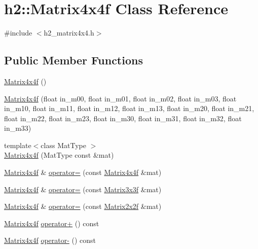 \hypertarget{classh2_1_1_matrix4x4f}{\section{h2\-:\-:Matrix4x4f Class Reference}
\label{classh2_1_1_matrix4x4f}
}


{\ttfamily \#include $<$h2\-\_\-matrix4x4.\-h$>$}

\subsection*{Public Member Functions}
\begin{DoxyCompactItemize}
\item 
\hyperlink{classh2_1_1_matrix4x4f_a2d77ee0ff229519884cdc69c3c4d9d4d}{Matrix4x4f} ()
\item 
\hyperlink{classh2_1_1_matrix4x4f_a44018cad0ac7e6093221ad7bbbe6bd94}{Matrix4x4f} (float in\-\_\-m00, float in\-\_\-m01, float in\-\_\-m02, float in\-\_\-m03, float in\-\_\-m10, float in\-\_\-m11, float in\-\_\-m12, float in\-\_\-m13, float in\-\_\-m20, float in\-\_\-m21, float in\-\_\-m22, float in\-\_\-m23, float in\-\_\-m30, float in\-\_\-m31, float in\-\_\-m32, float in\-\_\-m33)
\item 
{\footnotesize template$<$class Mat\-Type $>$ }\\\hyperlink{classh2_1_1_matrix4x4f_aca35c97f3111e78452e0de91644039cc}{Matrix4x4f} (Mat\-Type const \&mat)
\item 
\hyperlink{classh2_1_1_matrix4x4f}{Matrix4x4f} \& \hyperlink{classh2_1_1_matrix4x4f_a3711ef8b60c9d83e1c13c2e6c20040e6}{operator=} (const \hyperlink{classh2_1_1_matrix4x4f}{Matrix4x4f} \&mat)
\item 
\hyperlink{classh2_1_1_matrix4x4f}{Matrix4x4f} \& \hyperlink{classh2_1_1_matrix4x4f_ad27b689a7b094756d0651b0bff4155df}{operator=} (const \hyperlink{classh2_1_1_matrix3x3f}{Matrix3x3f} \&mat)
\item 
\hyperlink{classh2_1_1_matrix4x4f}{Matrix4x4f} \& \hyperlink{classh2_1_1_matrix4x4f_aee40852c5971f789dc5c3381d74e8a35}{operator=} (const \hyperlink{classh2_1_1_matrix2x2f}{Matrix2x2f} \&mat)
\item 
\hyperlink{classh2_1_1_matrix4x4f}{Matrix4x4f} \hyperlink{classh2_1_1_matrix4x4f_af9d0331d480332869702ef3d4e312763}{operator+} () const 
\item 
\hyperlink{classh2_1_1_matrix4x4f}{Matrix4x4f} \hyperlink{classh2_1_1_matrix4x4f_aa411d55e986207713cd5b9ee37d884b8}{operator-\/} () const 

\end{DoxyCompactItemize}
